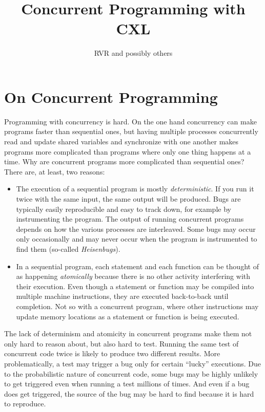 \documentclass{report}
\title{Concurrent Programming with CXL}
\author{RVR and possibly others}
\begin{document}
\maketitle
\tableofcontents

\chapter{On Concurrent Programming}

Programming with concurrency is hard.  On the one hand concurrency
can make programs faster than sequential ones, but having multiple
processes concurrently read and update shared variables and
synchronize with one another makes programs more complicated than
programs where only one thing happens at a time.  Why are concurrent
programs more complicated than sequential ones?
There are, at least, two reasons:
\begin{itemize}
\item The execution of a sequential program is mostly \emph{deterministic}.
If you run it twice with the same input, the same output will be produced.
Bugs are typically easily reproducible and easy to track down, for example
by instrumenting the program.
The output of running concurrent programs depends on how the various
processes are interleaved.  Some bugs may occur only occasionally and
may never occur when the program is instrumented to find them
(so-called \emph{Heisenbugs}).
\item In a sequential program, each statement and each function can be
thought of as happening \emph{atomically} because there is no other activity
interfering with their execution.  Even though a statement or function may
be compiled into multiple machine instructions, they are executed back-to-back
until completion.  Not so with a concurrent program, where other instructions
may update memory locations as a statement or function is being executed.
\end{itemize}
The lack of determinism and atomicity in concurrent programs make them
not only hard to reason about, but also hard to test.
Running the same test of concurrent code twice is likely to produce
two different results.  More problematically, a test may trigger a
bug only for certain ``lucky'' executions.  Due to the probabilistic
nature of concurrent code, some bugs may be highly unlikely to get
triggered even when running a test millions of times.  And even if
a bug does get triggered, the source of the bug may be hard to find
because it is hard to reproduce.
\end{document}

